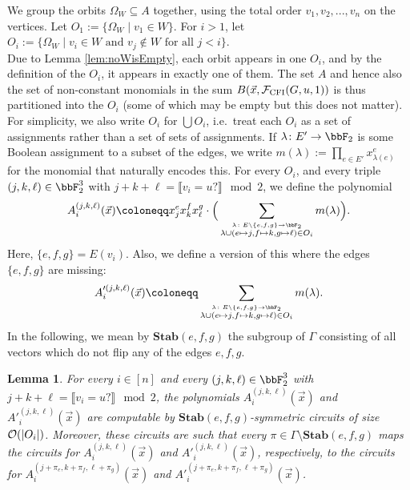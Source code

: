 \documentclass[10pt,a4paper]{article}
\newtheorem{lemma}[theorem]{Lemma}
\newcommand{\Ff}{{\cal F}}
\newcommand{\Oo}{{\cal O}}
\newcommand{\Stab}{\mathbf{Stab}}
\newcommand{\CFI}{\Ff_{\mathrm{CFI}}}
\begin{document}
We group the orbits $\Omega_W \subseteq A$ together, using the total order $v_1,v_2,...,v_n$ on the vertices. Let $O_1 := \{ \Omega_W \mid v_1 \in W  \}$. For $i > 1$, let $O_i := \{ \Omega_{W} \mid v_i \in W \text{ and } v_j \notin W \text{ for all } j <i   \}$.\\
Due to Lemma \ref{lem:noWisEmpty}, each orbit appears in one $O_i$, and by the definition of the $O_i$, it appears in exactly one of them.
The set $A$ and hence also the set of non-constant monomials in the sum $B(\vec x, \CFI(G,u,1))$ is thus partitioned into the $O_i$ (some of which may be empty but this does not matter). For simplicity, we also write $O_i$ for $\bigcup O_i$, i.e.\ treat each $O_i$ as a set of assignments rather than a set of sets of assignments.
If $\lambda\colon E' \to \bbF_2$ is some Boolean assignment to a subset of the edges, we write $m(\lambda) := \prod_{e \in E'} x^{e}_{\lambda(e)}$ for the monomial that naturally encodes this.
For every $O_i$, and every triple $(j,k,\ell) \in \bbF_2^3$ with $j+k+\ell = \llbracket v_i= u? \rrbracket \mod 2$, we define the polynomial
\[
A^{(j,k,\ell)}_i(\vec x) \coloneqq x^{e}_jx^f_kx^g_\ell \cdot \Big( \sum_{\stackrel{\lambda \colon E \setminus \{e,f,g\} \to \bbF_2}{\lambda \cup (e \mapsto j, f \mapsto k, g \mapsto \ell) \in O_i}} m(\lambda) \Big).       
\] 
Here, $\{e,f,g\} = E(v_i)$. Also, we define a version of this where the edges $\{e,f,g\}$ are missing:
\[
A'^{(j,k,\ell)}_i(\vec x) \coloneqq  \sum_{\stackrel{\lambda \colon E \setminus \{e,f,g\} \to \bbF_2}{\lambda \cup (e \mapsto j, f \mapsto k, g \mapsto \ell) \in O_i}} m(\lambda).       
\] 
In the following, we mean by $\Stab(e,f,g)$ the subgroup of $\Gamma$ consisting of all vectors which do not flip any of the edges $e,f,g$.
\begin{lemma}
	\label{lem:computingA}
	For every $i \in [n]$ and every $(j,k,\ell) \in \bbF_2^3$ with $j+k+\ell = \llbracket v_i= u? \rrbracket \mod 2$, the polynomials $A^{(j,k,\ell)}_i(\vec x)$ and $A'^{(j,k,\ell)}_i(\vec x)$ are computable by $\Stab(e,f,g)$-symmetric circuits of size $\Oo(|O_i|)$. Moreover, these circuits are such that every $\pi \in \Gamma \setminus \Stab(e,f,g)$ maps the circuits for $A^{(j,k,\ell)}_i(\vec x)$ and $A'^{(j,k,\ell)}_i(\vec x)$, respectively, to the circuits for $A^{(j+\pi_e,k+\pi_f,\ell+\pi_g)}_i(\vec x)$ and $A'^{(j+\pi_e,k+\pi_f,\ell+\pi_g)}_i(\vec x)$.
\end{lemma}	
\end{document}
